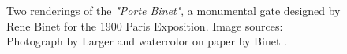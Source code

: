 \documentclass{article}
\begin{document}
\begin{figure}
    \centering
    \caption{Two renderings of the \textit{"Porte Binet"}, a monumental gate designed by Rene Binet for the 1900 Paris Exposition. Image sources: Photograph by Larger \cite{louis_porte_1900} and watercolor on paper by Binet \cite{binet_projet_1898}.}
    \label{fig:arch}
\end{figure}

\clearpage
\printbibliography
\end{document}
